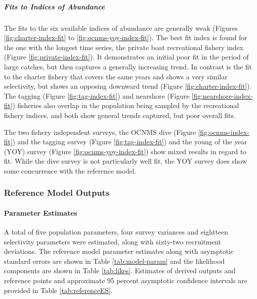 \documentclass[11pt,
  english,
  letterpaper,
]{article}
\begin{document}
\hypertarget{fits-to-indices-of-abundance}{%
\subparagraph{Fits to Indices of Abundance}\label{fits-to-indices-of-abundance}}

The fits to the six available indices of abundance are generally weak (Figures \ref{fig:charter-index-fit} to \ref{fig:ocnms-yoy-index-fit}). The best fit index is found for the one with the longest time series, the private boat recreational fishery index (Figure \ref{fig:private-index-fit}). It demonstrates an initial poor fit in the period of large catches, but then captures a generally increasing trend. In contrast is the fit to the charter fishery that covers the same years and shows a very similar selectivity, but shows an opposing downward trend (Figure \ref{fig:charter-index-fit}). The tagging (Figure \ref{fig:tag-index-fit}) and nearshore (Figure \ref{fig:nearshore-index-fit}) fisheries also overlap in the population being sampled by the recreational fishery indices, and both show general trends captured, but poor overall fits.

The two fishery independent surveys, the OCNMS dive (Figure \ref{fig:ocnms-index-fit}) and the tagging survey (Figure \ref{fig:tag-index-fit}) and the young of the year (YOY) survey (Figure \ref{fig:ocnms-yoy-index-fit}) show mixed results in regard to fit. While the dive survey is not particularly well fit, the YOY survey does show some concurrence with the reference model.

\hypertarget{reference-model-outputs}{%
\subsubsection{Reference Model Outputs}\label{reference-model-outputs}}

\hypertarget{parameter-estimates}{%
\paragraph{Parameter Estimates}\label{parameter-estimates}}

A total of five population parameters, four survey variances and eightteen selectivity parameters were estimated, along with sixty-two recruitment deviations. The reference model parameter estimates along with asymptotic standard errors are shown in Table \ref{tab:model-param} and the likelihood components are shown in Table \ref{tab:likes}. Estimates of derived outputs and reference points and approximate 95 percent asymptotic confidence intervals are provided in Table \ref{tab:referenceES}.
\end{document}
